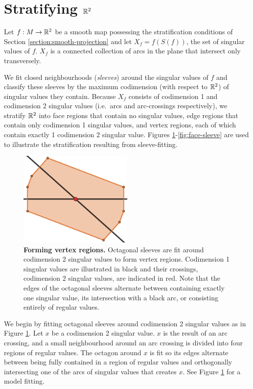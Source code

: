 \section{Stratifying $\mathbb{R}^2$}
\label{section:smooth-decompose}

Let $f:M\to\mathbb{R}^2$ be a smooth map possessing the stratification conditions of Section \ref{section:smooth-projection} and let $X_f = f(S(f))$, the set of singular values of $f$.
$X_f$ is a connected collection of arcs in the plane that intersect only transversely.

We fit closed neighbourhoods (\emph{sleeves}) around the singular values of $f$ and classify these sleeves by the maximum codimension (with respect to $\mathbb{R}^2$) of singular values they contain.
Because $X_f$ consists of codimension 1 and codimension 2 singular values (i.e.\ arcs and arc-crossings respectively), we stratify $\mathbb{R}^2$ into face regions that contain no singular values, edge regions that contain only codimension 1 singular values, and vertex regions, each of which contain exactly 1 codimension 2 singular value.
Figures \ref{fig:vertex-sleeve}-\ref{fig:face-sleeve} are used to illustrate the stratification resulting from sleeve-fitting.

\begin{figure}[h!]
	\centering
	\includegraphics[width=0.5\textwidth]{figures/vertex-sleeve.png}
	\caption{
		\textbf{Forming vertex regions.}
		Octagonal sleeves are fit around codimension 2 singular values to form vertex regions.
		Codimension 1 singular values are illustrated in black and their crossings, codimension 2 singular values, are indicated in red.
		Note that the edges of the octagonal sleeves alternate between containing exactly one singular value, its intersection with a black arc, or consisting entirely of regular values.
	}
	\label{fig:vertex-sleeve}
\end{figure}

We begin by fitting octagonal sleeves around codimension 2 singular values as in Figure \ref{fig:vertex-sleeve}.
Let $x$ be a codimension 2 singular value.
$x$ is the result of an arc crossing, and a small neighbourhood around an arc crossing is divided into four regions of regular values.
The octagon around $x$ is fit so its edges alternate between being fully contained in a region of regular values and orthogonally intersecting one of the arcs of singular values that creates $x$.
See Figure \ref{fig:vertex-sleeve} for a model fitting.

